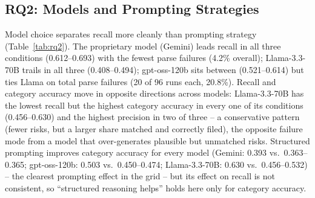 \documentclass[10pt, conference, letterpaper]{IEEEtran}
\begin{document}
\subsection{RQ2: Models and Prompting Strategies}
\label{sec:rq2-results}
Model choice separates recall more cleanly than prompting strategy
(Table~\ref{tab:rq2}). The proprietary model (Gemini) leads recall in all
three conditions (0.612--0.693) with the fewest parse failures (4.2\%
overall); Llama-3.3-70B trails in all three (0.408--0.494); gpt-oss-120b
sits between (0.521--0.614) but ties Llama on total parse failures (20 of
96 runs each, 20.8\%). Recall and category accuracy move in opposite
directions across models: Llama-3.3-70B has the lowest recall but the
highest category accuracy in every one of its conditions (0.456--0.630) and
the highest precision in two of three -- a conservative pattern (fewer
risks, but a larger share matched and correctly filed), the opposite
failure mode from a model that over-generates plausible but unmatched
risks. Structured prompting improves category accuracy for every model
(Gemini: 0.393 vs.\ 0.363--0.365; gpt-oss-120b: 0.503 vs.\ 0.450--0.474;
Llama-3.3-70B: 0.630 vs.\ 0.456--0.532) -- the clearest prompting effect in
the grid -- but its effect on recall is not consistent, so ``structured
reasoning helps'' holds here only for category accuracy.

\begin{table}[t]
\caption{Method A Results by Model and Prompting Strategy (Corpus-Wide, Excl.\ Short-Register Subgroup; 32 Runs/Cell)}
\label{tab:rq2}
\centering
{}
\end{table}
\end{document}

